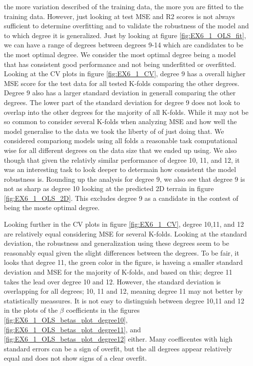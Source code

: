 \documentclass[11pt, a4paper]{article}
\begin{document}
the more variation described of the training data, the more you are fitted to the training data. However, just looking at test MSE and R2 scores is not always sufficient
to determine overfitting and to validate the robustness of the model and to which degree it is generalized. Just by looking at figure \ref{fig:EX6_1_OLS_fit}, we can have a range of degrees
between degrees 9-14 which are candidates to be the most optimal degree. We consider the most optimal degree being a model that has consistent good performance and not being underfitted or overfitted.
Looking at the CV plots in figure \ref{fig:EX6_1_CV}, degree 9 has a overall higher MSE score for the test data for all tested K-folds comparing the other degrees. Degree 9 also has a larger standard deviation
in generall comparing the other degrees. The lower part of the standard deviation for degree 9 does not look to overlap into the other degrees for the majority of all K-folds. While it may not be so common
to consider several K-folds when analyzing MSE and how well the model generalise to the data we took the liberty of of just doing that. We considered compariong models using all folds a reasonable task
computational wise for all different degrees on the data size that we ended up using. We also though that given the relativly similar performance of degree 10, 11, and 12, it was an interesting task to
look deeper to determain how consistent the model robustness is. Rounding up the analysis for degree 9, we also see that degree 9 is not as sharp as degree 10 looking at the predicted 2D terrain in figure \ref{fig:EX6_1_OLS_2D}.
This excludes degree 9 as a candidate in the contest of being the moste optimal degree.

Looking further in the CV plots in figure \ref{fig:EX6_1_CV}, degree 10,11, and 12 are relatively equal considering MSE for several K-folds. Looking at the standard deviation,
the robustness and generalization using these degrees seem to be reasonably equal given the slight differences between the degrees. To be fair, it looks that degree 11, the green color in the figure,
is haveing a smaller standard deviation and MSE for the majority of K-folds, and based on this; degree 11 takes the lead over degree 10 and 12. However, the standard deviation is overlapping for all
degrees; 10, 11 and 12, meaning degree 11 may not better by statistically meassures. It is not easy to distinguish between degree 10,11 and 12 in the
plots of the $\beta$ coefficients in the figures \ref{fig:EX6_1_OLS_betas_plot_degree10}, \ref{fig:EX6_1_OLS_betas_plot_degree11}, and \ref{fig:EX6_1_OLS_betas_plot_degree12} either.
Many coefficentes with high standard errors can be a sign of overfit, but the all degrees appear relatively equal and does not show signs of a clear overfit.
\end{document}
